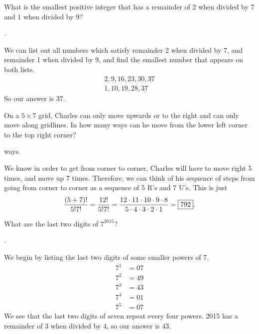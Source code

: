 \documentclass[11pt]{article}
\DeclareRobustCommand{\frac}[3][0pt]{%
  {\begingroup\hspace{#1}#2\hspace{#1}\endgroup\over\hspace{#1}#3\hspace{#1}}}
\begin{document}
\begin{problem}What is the smallest positive integer that has a remainder of 2 when divided by 7 and 1 when divided by 9?
\end{problem}
\begin{answer}
.
\end{answer}
\begin{solution}
We can list out all numbers which satisfy remainder 2 when divided by 7, and remainder 1 when divided by 9, and find the smallest number that appears on both lists.
\begin{align*}
2, 9, 16, 23, 30, \underline{37} \\
1, 10, 19, 28, \underline{37}
\end{align*}
So our answer is $\boxed{37}$.
\end{solution}

\begin{problem}On a $5 \times 7$ grid, Charles can only move upwards or to the right and can only move along gridlines. In how many ways can he move from the lower left corner to the top right corner?
\end{problem}
\begin{answer}
 ways.
\end{answer}
\begin{solution}
We know in order to get from corner to corner, Charles will have to move right 5 times, and move up 7 times. Therefore, we can think of his sequence of steps from going from corner to corner as a sequence of 5 R's and 7 U's. This is just
$$\frac{(5+7)!}{5!7!}=\frac{12!}{5!7!} = \frac{12 \cdot 11 \cdot 10 \cdot 9 \cdot 8}{5 \cdot 4 \cdot 3 \cdot 2 \cdot 1} = \boxed{792}.$$
\end{solution}

\begin{problem}What are the last two digits of $7^{2015}$?
\end{problem}
\begin{answer}
.
\end{answer}
\begin{solution}
We begin by listing the last two digits of some smaller powers of 7.
\begin{align*}
7^1 &= 07 \\
7^2 &= 49 \\
7^3 &= 43 \\
7^4 &= 01 \\
7^5 &= 07
\end{align*}
We see that the last two digits of seven repeat every four powers. 2015 has a remainder of 3 when divided by 4, so our answer is $\boxed{43}$.
\end{solution}
\end{document}
